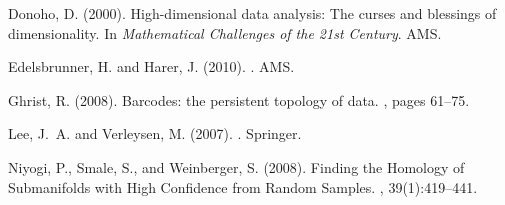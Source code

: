 \begin{thebibliography}{}
{
Donoho, D. (2000).
\newblock High-dimensional data analysis: The curses and blessings of
  dimensionality.
\newblock In {\em Mathematical Challenges of the 21st Century}. AMS.
\vspace{-2.4mm}

Edelsbrunner, H. and Harer, J. (2010).
.
\newblock AMS.%
\vspace{-2.4mm}

Ghrist, R. (2008).
\newblock Barcodes: the persistent topology of data.
, pages 61--75.
\vspace{-2.4mm}

Lee, J.~A. and Verleysen, M. (2007).
.
\newblock Springer.
\vspace{-2.4mm}

Niyogi, P., Smale, S., and Weinberger, S. (2008).
\newblock Finding the {H}omology of {S}ubmanifolds with {H}igh {C}onfidence
  from {R}andom {S}amples.
, 39(1):419--441.

}

\end{thebibliography}
